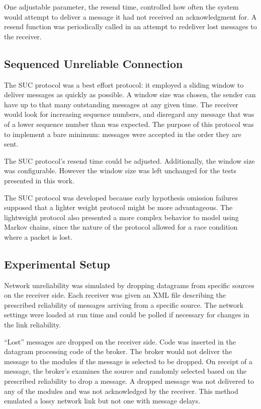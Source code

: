 One adjustable parameter, the resend time, controlled how often the system would attempt to deliver a message it had not received an acknowledgment for.
A resend function was periodically called in an attempt to redeliver lost messages to the receiver.

\subsection{Sequenced Unreliable Connection}
The SUC protocol was a best effort protocol: it employed a sliding window to deliver messages as quickly as possible.
A window size was chosen, the sender can have up to that many outstanding messages at any given time.
The receiver would look for increasing sequence numbers, and disregard any message that was of a lower sequence number than was expected.
The purpose of this protocol was to implement a bare minimum: messages were accepted in the order they are sent.

The SUC protocol's resend time could be adjusted. 
Additionally, the window size was configurable. 
However the window size was left unchanged for the tests presented in this work.

The SUC protocol was developed because early hypothesis omission failures supposed that a lighter weight protocol might be more advantageous.
The lightweight protocol also presented a more complex behavior to model using Markov chains, since the nature of the protocol allowed for a race condition where a packet is lost.

\subsection{Experimental Setup}
Network unreliability was simulated by dropping datagrams from specific sources on the receiver side.
Each receiver was given an XML file describing the prescribed reliability of messages arriving from a specific source.
The network settings were loaded at run time and could be polled if necessary for changes in the link reliability.

``Lost'' messages are dropped on the receiver side. 
Code was inserted in the datagram processing code of the broker.
The broker would not deliver the message to the modules if the message is selected to be dropped.
On receipt of a message, the broker's examines the source and randomly selected based on the prescribed reliability to drop a message.
A dropped message was not delivered to any of the modules and was not acknowledged by the receiver.
This method emulated a lossy network link but not one with message delays.

